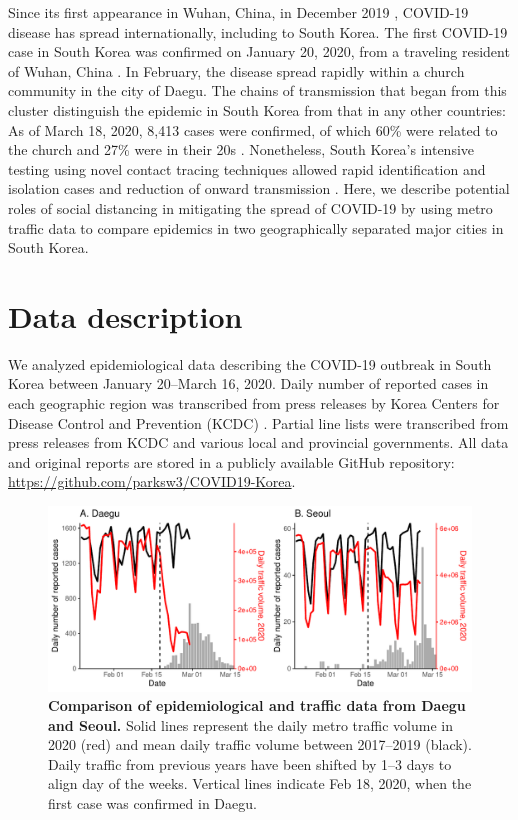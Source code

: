 \documentclass[12pt]{article}
\begin{document}
Since its first appearance in Wuhan, China, in December 2019 \citep{pneumonia}, COVID-19 disease has spread internationally, including to South Korea.
The first COVID-19 case in South Korea was confirmed on January 20, 2020, from a traveling resident of Wuhan, China \citep{kcdc}.
In February, the disease spread rapidly within a church community in the city of Daegu.
The chains of transmission that began from this cluster distinguish the epidemic in South Korea from that in any other countries:
As of March 18, 2020, 8,413 cases were confirmed, of which 60\% were related to the church and 27\% were in their 20s \citep{kcdc}.
Nonetheless, South Korea's intensive testing using novel contact tracing techniques allowed rapid identification and isolation cases and reduction of onward transmission \citep{fergusonimpact, tracingkorea, science}.
Here, we describe potential roles of social distancing in mitigating the spread of COVID-19 by using metro traffic data to compare epidemics in two geographically separated major cities in South Korea.

\section{Data description}

We analyzed epidemiological data describing the COVID-19 outbreak in South Korea between January 20--March 16, 2020.
Daily number of reported cases in each geographic region was transcribed from press releases by Korea Centers for Disease Control and Prevention (KCDC) \cite{kcdc}.
Partial line lists were transcribed from press releases from KCDC and various local and provincial governments.
All data and original reports are stored in a publicly available GitHub repository: \url{https://github.com/parksw3/COVID19-Korea}.

\begin{figure}[!h]
\includegraphics[width=\textwidth]{figure_compare_report.pdf}
\caption{
\textbf{Comparison of epidemiological and traffic data from Daegu and Seoul.}
Solid lines represent the daily metro traffic volume in 2020 (red) and mean daily traffic volume between 2017--2019 (black).
Daily traffic from previous years have been shifted by 1--3 days to align day of the weeks.
Vertical lines indicate Feb 18, 2020, when the first case was confirmed in Daegu.
}
\label{fig:data}
\end{figure}
\end{document}
